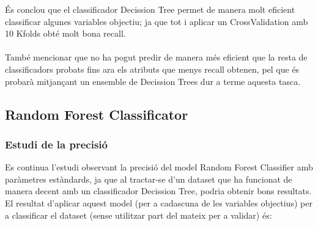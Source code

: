 \documentclass[a4paper, 11pt]{article}
\begin{document}
És conclou que el classificador Decission Tree permet de manera molt eficient classificar algunes variables objectiu; ja que tot i aplicar un CrossValidation amb 10 Kfolds obté molt bona recall.\\\\
També mencionar que no ha pogut predir de manera més eficient que la resta de classificadors probats fins ara els atributs que menys recall obtenen, pel que és probarà mitjançant un ensemble de Decission Trees dur a terme aquesta tasca.
\newpage


\subsection{Random Forest Classificator}\label{random}
\subsubsection{Estudi de la precisió}
Es continua l'estudi observant la precisió del model Random Forest Classifier amb paràmetres estàndards, ja que al tractar-se d'un dataset que ha funcionat de manera decent amb un classificador Decission Tree, podria obtenir bons resultats.\\
El resultat d'aplicar aquest model (per a cadascuna de les variables objectius) per a classificar el dataset (sense utilitzar part del mateix per a validar) és:
\end{document}
